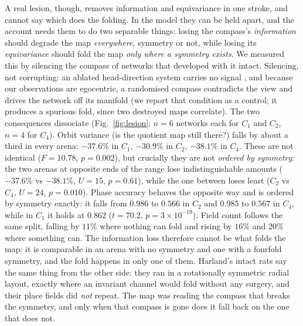 \documentclass[9pt,lineno]{elife}
\begin{document}
A real lesion, though, removes information and equivariance in one stroke, and cannot say which does the
folding. In the model they can be held apart, and the account needs them to do two separable things:
losing the compass's \emph{information} should degrade the map \emph{everywhere}, symmetry or not,
while losing its \emph{equivariance} should fold the map \emph{only where a symmetry exists}. We
measured this by silencing the compass of networks that developed with it intact. Silencing, not
corrupting: an ablated head-direction system carries no signal \citep{bassett2007}, and because our
observations are egocentric, a randomised compass contradicts the view and drives the network off its
manifold (we report that condition as a control; it produces a spurious fold, since two destroyed maps
correlate). The two consequences dissociate (Fig.~\ref{fig:lesion}; $n = 6$ networks each for $C_1$
and $C_2$, $n = 4$ for $C_4$). Orbit variance (is the quotient map still there?) falls by about a
third in every arena: $-37.6\%$ in $C_1$, $-30.9\%$ in $C_2$, $-38.1\%$ in $C_4$. These are not
identical ($F = 10.78$, $p = 0.002$), but crucially they are not \emph{ordered by symmetry}: the two
arenas at opposite ends of the range lose indistinguishable amounts ($-37.6\%$ vs $-38.1\%$, $U = 15$,
$p = 0.61$), while the one between loses least ($C_2$ vs $C_4$, $U = 24$, $p = 0.010$). Phase accuracy
behaves the opposite way and is ordered by symmetry exactly: it falls from $0.986$ to $0.566$ in $C_2$
and $0.985$ to $0.567$ in $C_4$, while in $C_1$ it holds at $0.862$ ($t = 70.2$, $p = 3\times10^{-19}$).
Field count follows the same split, falling by $11\%$ where nothing can fold and rising by $16\%$ and
$20\%$ where something can. The information loss therefore cannot be what folds the map: it is
comparable in an arena with no symmetry and one with a fourfold symmetry, and the fold happens in only
one of them. Harland's intact rats say the same thing from the other side: they ran in a rotationally
symmetric radial layout, exactly where an invariant channel would fold without any surgery, and their
place fields did \emph{not} repeat. The map was reading the compass that breaks the symmetry, and only
when that compass is gone does it fall back on the one that does not.
\end{document}
